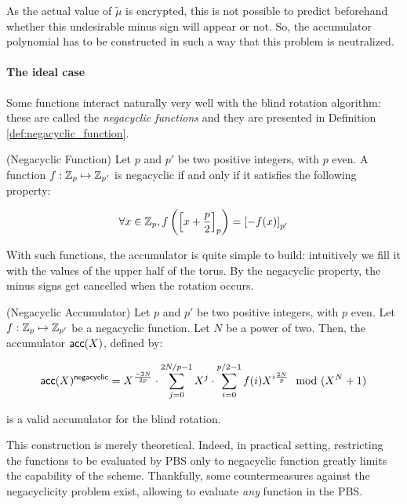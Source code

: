 As the actual value of $\tilde{\mu}$ is encrypted, this is not possible to predict beforehand whether this undesirable minus sign will appear or not. So, the accumulator polynomial has to be constructed in such a way that this problem is neutralized.


\paragraph{The ideal case}

Some functions interact naturally very well with the blind rotation algorithm: these are called the \textit{negacyclic functions} and they are presented in Definition \ref{def:negacyclic_function}.


\begin{definition} (Negacyclic Function)
	Let $p$ and $p'$ be two positive integers, with $p$ even. A function $f : \mathbb{Z}_p \mapsto \mathbb{Z}_{p'}$ is negacyclic if and only if it satisfies the following property:
	
	\[
		\forall x \in \mathbb{Z}_p, f\left (\left [ x + \frac p 2 \right ]_{p} \right ) = \left [ -f(x) \right ]_{p'}
	\]
	
	\label{def:negacyclic_function}
\end{definition}


With such functions, the accumulator is quite simple to build: intuitively we fill it with the values of the upper half of the torus. By the negacyclic property, the minus signs get cancelled when the rotation occurs.

\begin{definition} (Negacyclic Accumulator)
Let $p$ and $p'$ be two positive integers, with $p$ even. Let $f:\mathbb{Z}_p \mapsto \mathbb{Z}_{p'}$ be a negacyclic function. Let $N$ be a power of two. Then, the accumulator $\textsf{acc}(X)$, defined by:
	
	\[
		\textsf{acc}(X)^{\textsf{negacyclic}} = X^{\frac{-2N}{2p}} \cdot \sum_{j=0}^{2N / p - 1} X^j \cdot \sum_{i=0}^{p/2 - 1} f(i) X^{i \frac{2N}{p}} \mod (X^N + 1)
	\]
	
	is a valid accumulator for the blind rotation.
\end{definition}


This construction is merely theoretical. Indeed, in practical setting, restricting the functions to be evaluated by PBS only to negacyclic function greatly limits the capability of the scheme. Thankfully, some countermeasures against the negacyclicity problem exist, allowing to evaluate \textit{any} function in the PBS.



